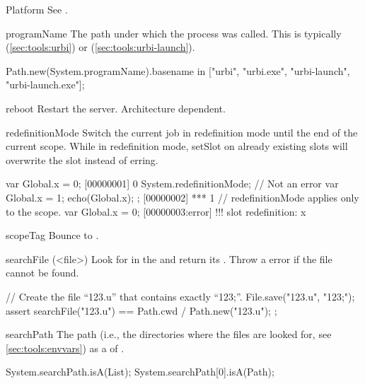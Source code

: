 \begin{urbiscriptapi}
\item[Platform] See .


\item[programName] The path under which the \urbi process was called.
  This is typically  (\autoref{sec:tools:urbi}) or
   (\autoref{sec:tools:urbi-launch}).
\begin{urbiassert}
Path.new(System.programName).basename
  in ["urbi", "urbi.exe", "urbi-launch", "urbi-launch.exe"];
\end{urbiassert}


\item[reboot] Restart the \urbi server.  Architecture dependent.


\item[redefinitionMode] Switch the current job in redefinition mode
  until the end of the current scope.  While in redefinition mode,
  setSlot on already existing slots will overwrite the slot instead of
  erring.

\begin{urbiscript}
var Global.x = 0;
[00000001] 0
{
  System.redefinitionMode;
  // Not an error
  var Global.x = 1;
  echo(Global.x);
};
[00000002] *** 1
// redefinitionMode applies only to the scope.
var Global.x = 0;
[00000003:error] !!! slot redefinition: x
\end{urbiscript}




\item[scopeTag] Bounce to .


\item[searchFile](<file>)%
  Look for  in the  and return its
  .  Throw a  error if the
  file cannot be found.
\begin{urbiscript}
// Create the file ``123.u'' that contains exactly ``123;''.
File.save("123.u", "123;");
assert
{
  searchFile("123.u") == Path.cwd / Path.new("123.u");
};
\end{urbiscript}


\item[searchPath] The \urbi path (i.e., the directories where the \us files
  are looked for, see \autoref{sec:tools:envvars}) as a  of
  .
\begin{urbiassert}
System.searchPath.isA(List);
System.searchPath[0].isA(Path);
\end{urbiassert}



\end{urbiscriptapi}

